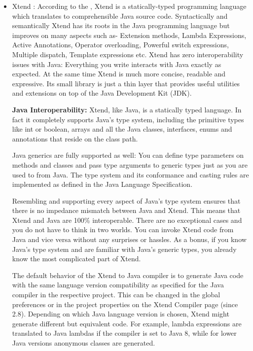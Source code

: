 \begin{itemize}
	\item Xtend : According to the \cite{ref_20_xtend}, Xtend is a statically-typed programming language which translates to comprehensible Java source code. Syntactically and semantically Xtend has its roots in the Java programming language but improves on many aspects such as- Extension methods, Lambda Expressions, Active Annotations, Operator overloading, Powerful switch expressions, Multiple dispatch, Template expressions etc. Xtend has zero interoperability issues with Java: Everything you write interacts with Java exactly as expected. At the same time Xtend is much more concise, readable and expressive. Its small library is just a thin layer that provides useful utilities and extensions on top of the Java Development Kit (JDK). 
	
	\textbf{Java Interoperability:}
	Xtend, like Java, is a statically typed language. In fact it completely supports Java's type system, including the primitive types like int or boolean, arrays and all the Java classes, interfaces, enums and annotations that reside on the class path.
	
	Java generics are fully supported as well: You can define type parameters on methods and classes and pass type arguments to generic types just as you are used to from Java. The type system and its conformance and casting rules are implemented as defined in the Java Language Specification.
	
	Resembling and supporting every aspect of Java's type system ensures that there is no impedance mismatch between Java and Xtend. This means that Xtend and Java are 100\% interoperable. There are no exceptional cases and you do not have to think in two worlds. You can invoke Xtend code from Java and vice versa without any surprises or hassles. As a bonus, if you know Java's type system and are familiar with Java's generic types, you already know the most complicated part of Xtend.
	
	The default behavior of the Xtend to Java compiler is to generate Java code with the same language version compatibility as specified for the Java compiler in the respective project. This can be changed in the global preferences or in the project properties on the Xtend  Compiler page (since 2.8). Depending on which Java language version is chosen, Xtend might generate different but equivalent code. For example, lambda expressions are translated to Java lambdas if the compiler is set to Java 8, while for lower Java versions anonymous classes are generated.
	

\end{itemize}
